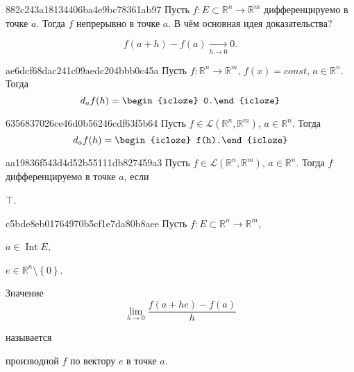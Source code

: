 \begin{note}{882c243a18134406ba4e9bc78361ab97}
    Пусть \({ f : E \subset \mathbb R^{n} \to \mathbb R^{m} }\) дифференцируемо в точке \({ a }\).
    Тогда \({ f }\) непрерывно в точке \({ a }\).
    В чём основная идея доказательства?

    \begin{cloze}{1}
        \[
            f(a + h) - f(a) \underset{h \to 0}\longrightarrow 0.
        \]
    \end{cloze}
\end{note}

\begin{note}{ae6dcf68dac241c09aedc204bbb0c45a}
    Пусть \({ f : \mathbb R^{n} \to \mathbb R^{m} }\),\: \({ f(x) = const }\),\: \({ a \in \mathbb R^{n} }\).
    Тогда
    \[
        d_{a} f(h) = \begin{icloze}{1}0.\end{icloze}
    \]
\end{note}

\begin{note}{6356837026ce46d0b56246cdf63f5b64}
    Пусть \({ f \in \mathcal L(\mathbb R^{n}, \mathbb R^{m}) }\),\: \({ a \in \mathbb R^{n} }\).
    Тогда
    \[
        d_{a} f(h) = \begin{icloze}{1}f(h).\end{icloze}
    \]
\end{note}

\begin{note}{aa19836f543d4d52b55111db827459a3}
    Пусть \({ f \in \mathcal L(\mathbb R^{n}, \mathbb R^{m}) }\),\: \({ a \in \mathbb R^{n} }\).
    Тогда \({ f }\) дифференцируемо в точке \({ a }\), если \begin{icloze}{1}\({ \top }\).\end{icloze}
\end{note}

\begin{note}{c5bde8eb01764970b5cf1e7da80b8aee}
    Пусть \({ f : E \subset \mathbb R^{n} \to \mathbb R^{m} }\), \begin{icloze}{4}\({ a \in \operatorname{Int} E }\),\end{icloze}\: \begin{icloze}{3}\({ e \in \mathbb R^{n} \setminus \left\{ 0 \right\} }\).\end{icloze}
    \begin{icloze}{1}
        Значение
        \[
            \lim_{h \to 0} \frac{f(a + he) - f(a)}{h}
        \]
    \end{icloze}
    называется \begin{icloze}{2}производной \({ f }\) по вектору \({ e }\) в точке \({ a }\).\end{icloze}
\end{note}

